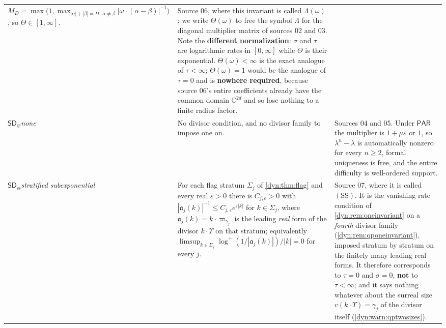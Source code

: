 \documentclass[11pt,letterpaper]{article}
\theoremstyle{definition}
\theoremstyle{remark}
\newcommand{\C}{\mathbb C}
\newcommand{\eps}{\varepsilon}
\newcommand{\sdno}{\mathsf{SD}_{\varnothing}}
\newcommand{\pares}{\mathsf{PAR}}
\newcommand{\sdss}{\mathsf{SD}_{\mathrm{ss}}}
\newcommand{\fla}{\mathfrak a}
\numberwithin{equation}{section}
\begin{document}
\begin{longtable}{@{}P{0.12\textwidth}P{0.41\textwidth}P{0.40\textwidth}@{}}
$M_{D}=\max\bigl(1,\max_{|\alpha|+|\beta|=D,\ \alpha\ne\beta}
|\omega\cdot(\alpha-\beta)|^{-1}\bigr)$, so
$\Theta\in[1,\infty]$.
&
Source 06, where this invariant is called $\Lambda(\omega)$; we write
$\Theta(\omega)$ to free the symbol $\Lambda$ for the diagonal multiplier
matrix of sources 02 and 03. Note the \textbf{different normalization}:
$\sigma$ and $\tau$ are logarithmic rates in $[0,\infty]$ while $\Theta$
is their exponential. $\Theta(\omega)<\infty$ is the exact analogue of
$\tau<\infty$; $\Theta(\omega)=1$ would be the analogue of $\tau=0$ and
is \textbf{nowhere required}, because source 06's entire coefficients
already have the common domain $\C^{2d}$ and so lose nothing to a finite
radius factor.\\[4pt]
$\sdno$\newline \emph{none}
&
No divisor condition, and no divisor family to impose one on.
&
Sources 04 and 05. Under $\pares$ the multiplier is $1+\mu\eps$ or
$1$, so $\lambda^{n}-\lambda$ is automatically nonzero for every
$n\ge2$, formal uniqueness is free, and the entire difficulty is
well-ordered support.\\[4pt]
$\sdss$\newline \emph{stratified subexponential}
&
For each flag stratum $\Sigma_j$ of \cref{dyn:thm:flag} and every real
$\eps>0$ there is $C_{j,\eps}>0$ with
$|\fla_j(k)|^{-1}\le C_{j,\eps}e^{\eps|k|}$ for $k\in\Sigma_j$, where
$\fla_j(k)=k\cdot\varpi_{\gamma_j}$ is the leading \emph{real} form of the
divisor $k\cdot\Upsilon$ on that stratum; equivalently
$\limsup_{k\in\Sigma_j}\log^{+}(1/|\fla_j(k)|)/|k|=0$ for every $j$.
&
Source 07, where it is called $(\mathrm{SS})$. It is the vanishing-rate
condition of \cref{dyn:rem:oneinvariant} on a \emph{fourth} divisor family
(\cref{dyn:rem:qponeinvariant}), imposed stratum by stratum on the
finitely many leading real forms. It therefore corresponds to $\tau=0$ and
$\sigma=0$, \textbf{not} to $\tau<\infty$; and it says nothing whatever
about the surreal size $v(k\cdot\Upsilon)=\gamma_j$ of the divisor itself
(\cref{dyn:warn:qptwosizes}).\\
\bottomrule
\end{longtable}
\end{document}
